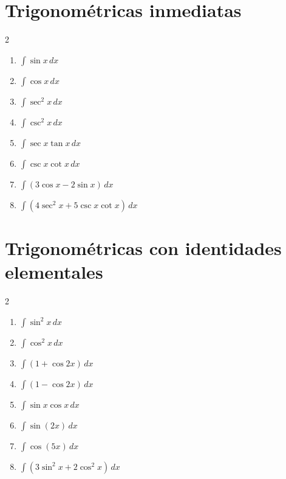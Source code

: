 \documentclass[11pt]{article}
\begin{document}
\section{Trigonométricas inmediatas}
\begin{multicols}{2}\begin{enumerate}
\item $\displaystyle \int\sin x\,dx$
\item $\displaystyle \int\cos x\,dx$
\item $\displaystyle \int\sec^2x\,dx$
\item $\displaystyle \int\csc^2x\,dx$
\item $\displaystyle \int\sec x\tan x\,dx$
\item $\displaystyle \int\csc x\cot x\,dx$
\item $\displaystyle \int(3\cos x-2\sin x)\,dx$
\item $\displaystyle \int(4\sec^2x+5\csc x\cot x)\,dx$
\end{enumerate}\end{multicols}

\section{Trigonométricas con identidades elementales}
\begin{multicols}{2}\begin{enumerate}
\item $\displaystyle \int\sin^2x\,dx$
\item $\displaystyle \int\cos^2x\,dx$
\item $\displaystyle \int(1+\cos 2x)\,dx$
\item $\displaystyle \int(1-\cos 2x)\,dx$
\item $\displaystyle \int\sin x\cos x\,dx$
\item $\displaystyle \int\sin(2x)\,dx$
\item $\displaystyle \int\cos(5x)\,dx$
\item $\displaystyle \int(3\sin^2x+2\cos^2x)\,dx$
\end{enumerate}\end{multicols}
\end{document}
